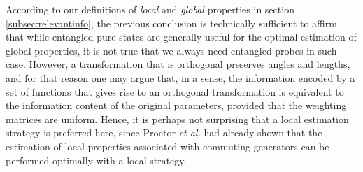According to our definitions of \emph{local} and \emph{global} properties in section \ref{subsec:relevantinfo}, the previous conclusion is technically sufficient to affirm that while entangled pure states are generally useful for the optimal estimation of global properties, it is not true that we always need entangled probes in such case. However, a transformation that is orthogonal preserves angles and lengths, and for that reason one may argue that, in a sense, the information encoded by a set of functions that gives rise to an orthogonal transformation is equivalent to the information content of the original parameters, provided that the weighting matrices are uniform. Hence, it is perhaps not surprising that a local estimation strategy is preferred here, since Proctor \emph{et al.} \cite{proctor2017networked, proctor2017networkedshort} had already shown that the estimation of local properties associated with commuting generators can be performed optimally with a local strategy. 

